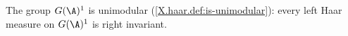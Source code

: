 The group $G(\A)^1$ is unimodular (\cref{X.haar.def:is-unimodular}): every left Haar measure on $G(\A)^1$ is right
invariant.
